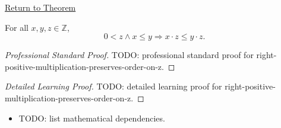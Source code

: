 \newpage
{}
\label{prf:right-positive-multiplication-preserves-order-on-z}

\begin{remark*}[Return]
\hyperref[cor:right-positive-multiplication-preserves-order-on-z]{Return to Theorem}
\end{remark*}

\begin{corollary*}
For all $x,y,z\in\mathbb{Z}$,
\[
0<z\land x\le y \Longrightarrow x\cdot z\le y\cdot z.
\]
\end{corollary*}

\begin{proof}[Professional Standard Proof]
\LRAProofBodyStart
TODO: professional standard proof for right-positive-multiplication-preserves-order-on-z.
\end{proof}

\begin{proof}[Detailed Learning Proof]
\LRAProofBodyStart
TODO: detailed learning proof for right-positive-multiplication-preserves-order-on-z.
\end{proof}

\begin{remark*}
\end{remark*}

\begin{dependencies}
\begin{itemize}
  \item TODO: list mathematical dependencies.
\end{itemize}
\end{dependencies}

\clearpage
